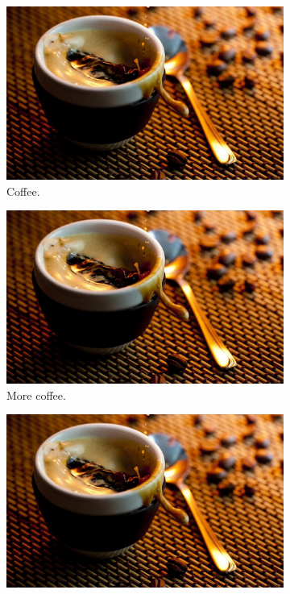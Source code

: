 \documentclass[11pt]{article}  %
\begin{document}
      \begin{figure}[h!]
        \centering
        \begin{subfigure}[h]{0.2\linewidth}
          \includegraphics[width=\linewidth]{support/coffee.jpg}
          \caption{Coffee.}
        \end{subfigure}
        \begin{subfigure}[h]{0.2\linewidth}
          \includegraphics[width=\linewidth]{support/coffee.jpg}
          \caption{More coffee.}
        \end{subfigure}
        \begin{subfigure}[h]{0.2\linewidth}
          \includegraphics[width=\linewidth]{support/coffee.jpg}

\end{subfigure}
\end{figure}
\end{document}
